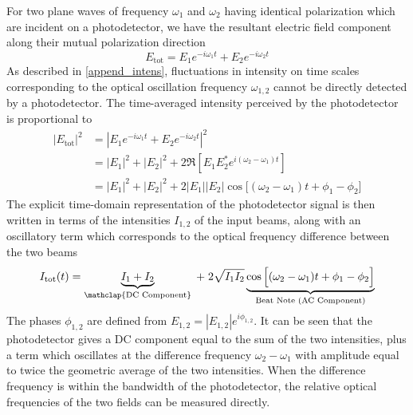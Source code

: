 For two plane waves of frequency $\omega_1$ and $\omega_2$ having identical polarization which are incident on a photodetector, we have the resultant electric field component along their mutual polarization direction
\begin{equation}
	E_\mathrm{tot} = E_1 e^{-i\omega_1 t} + E_2 e^{-i\omega_2 t}
\end{equation}
As described in \ref{append_intens}, fluctuations in intensity on time scales corresponding to the optical oscillation frequency $\omega_{1,2}$ cannot be directly detected by a photodetector. The time-averaged intensity perceived by the photodetector is proportional to
\begin{align}
	\left|E_\mathrm{tot}\right|^2 &= \left|E_1 e^{-i\omega_1 t} + E_2 e^{-i\omega_2 t}\right|^2 \nonumber \\
	&= \left|E_1\right|^2 + \left|E_2\right|^2 + 2 \Re \left[E_1 E_2^* e^{i(\omega_2 - \omega_1)t}\right] \nonumber \\
	&= \left|E_1\right|^2 + \left|E_2\right|^2
	+ 2 \left|E_1\right|\left|E_2\right|
	\cos\Big[(\omega_2 - \omega_1)t + \phi_1 - \phi_2\Big] \nonumber
\end{align}
The explicit time-domain representation of the photodetector signal is then written in terms of the intensities $I_{1,2}$ of the input beams, along with an oscillatory term which corresponds to the optical frequency difference between the two beams
\begin{equation}\label{beatnote_two}
	I_\mathrm{tot} (t) = \underbrace{I_1 + I_2}_{\mathclap{\text{DC Component}}} 
	\;+\; 2 \sqrt{I_1 I_2}
	\underbrace{\cos\Big[(\omega_2 - \omega_1)t + \phi_1 - \phi_2\Big]}_{\text{Beat Note (AC Component)}}
\end{equation}
The phases $\phi_{1,2}$ are defined from $E_{1,2} = \left|E_{1,2}\right|e^{i\phi_{1,2}}$. It can be seen that the photodetector gives a DC component equal to the sum of the two intensities, plus a term which oscillates at the difference frequency $\omega_2 - \omega_1$ with amplitude equal to twice the geometric average of the two intensities. When the difference frequency is within the bandwidth of the photodetector, the relative optical frequencies of the two fields can be measured directly.

